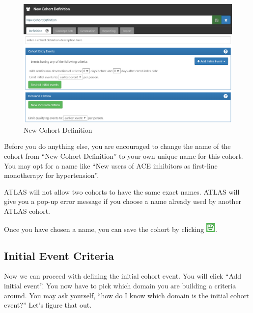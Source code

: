 \documentclass[11pt]{book}
\theoremstyle{definition}
\theoremstyle{definition}
\theoremstyle{definition}
\theoremstyle{remark}
\let\BeginKnitrBlock\begin \let\EndKnitrBlock\end
\begin{document}
\begin{figure}

{\centering \includegraphics[width=1\linewidth]{images/Cohorts/ATLAS-defineacohort} 

}

\caption{New Cohort Definition}\label{fig:ATLASdefineacohort}
\end{figure}

Before you do anything else, you are encouraged to change the name of
the cohort from ``New Cohort Definition'' to your own unique name for
this cohort. You may opt for a name like ``New users of ACE inhibitors
as first-line monotherapy for hypertension''.

\BeginKnitrBlock{rmdimportant}
ATLAS will not allow two cohorts to have the same exact names. ATLAS
will give you a pop-up error message if you choose a name already used
by another ATLAS cohort.
\EndKnitrBlock{rmdimportant}

Once you have chosen a name, you can save the cohort by clicking
\includegraphics{images/Cohorts/save.png}.

\subsection{Initial Event Criteria}\label{initial-event-criteria}

Now we can proceed with defining the initial cohort event. You will
click ``Add initial event''. You now have to pick which domain you are
building a criteria around. You may ask yourself, ``how do I know which
domain is the initial cohort event?'' Let's figure that out.
\end{document}
